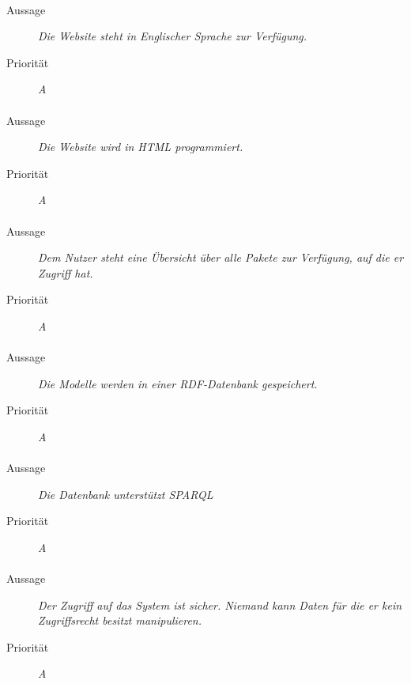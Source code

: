 \paragraph{}
\begin{description}
\item[Aussage] \textit{Die Website steht in Englischer Sprache zur Verfügung.}
\item[Priorität] \textit{A}
\end{description}

\paragraph{}
\begin{description}
\item[Aussage] \textit{Die Website wird in HTML programmiert.}
\item[Priorität] \textit{A}
\end{description}

\paragraph{}
\begin{description}
\item[Aussage] \textit{Dem Nutzer steht eine Übersicht über alle Pakete zur Verfügung, auf die er Zugriff hat.}
\item[Priorität] \textit{A}
\end{description}

\paragraph{}
\begin{description}
\item [Aussage] \textit{Die Modelle werden in einer RDF-Datenbank gespeichert.}
\item [Priorität] \textit{A}
\end{description}

\paragraph{}
\begin{description}
\item[Aussage] \textit{Die Datenbank unterstützt SPARQL}
\item[Priorität] \textit{A}
\end{description}

\paragraph{}
\begin{description}
\item[Aussage] \textit{Der Zugriff auf das System ist sicher. Niemand kann Daten für die er kein Zugriffsrecht besitzt manipulieren.}
\item[Priorität] \textit{A}
\end{description}

